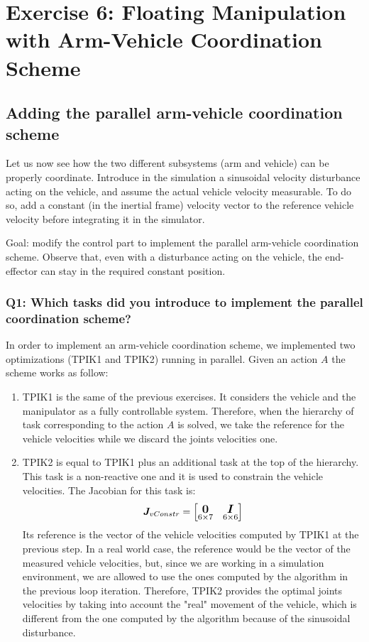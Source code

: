 \documentclass{article}
\begin{document}
\section{Exercise 6: Floating Manipulation with Arm-Vehicle Coordination Scheme}
\subsection{Adding the parallel arm-vehicle coordination scheme}
Let us now see how the two different subsystems (arm and vehicle) can be properly coordinate. Introduce in the simulation a sinusoidal velocity disturbance acting on the vehicle, and assume the actual vehicle velocity measurable. To do so, add a constant (in the inertial frame) velocity vector to the reference vehicle velocity before integrating it in the simulator. 

Goal: modify the control part to implement the parallel arm-vehicle coordination scheme. Observe that, even with a disturbance acting on the vehicle, the end-effector can stay in the required constant position.

\subsubsection{Q1: Which tasks did you introduce to implement the parallel coordination scheme?}
In order to implement an arm-vehicle coordination scheme, we implemented two optimizations (TPIK1 and TPIK2) running in parallel. Given an action $A$ the scheme works as follow:

\begin{enumerate}
\item TPIK1 is the same of the previous exercises. It considers the vehicle and the manipulator as a fully controllable system. Therefore, when the hierarchy of task corresponding to the action $A$ is solved, we take the reference for the vehicle velocities while we discard the joints velocities one.
\item TPIK2 is equal to TPIK1 plus an additional task at the top of the hierarchy. This task is a non-reactive one and it is used to constrain the vehicle velocities. The Jacobian for this task is:
\begin{equation}
\large
\boldsymbol{J}_{vConstr}=
    \begin{bmatrix}
     \underset{6\times7}{\boldsymbol{0}} & \underset{6\times6}{\boldsymbol{I}} \\
    \end{bmatrix}
\end{equation}
Its reference is the vector of the vehicle velocities computed by TPIK1 at the previous step. In a real world case, the reference would be the vector of the measured vehicle velocities, but, since we are working in a simulation environment, we are allowed to use the ones computed by the algorithm in the previous loop iteration.
Therefore, TPIK2 provides the optimal joints velocities by taking into account the "real" movement of the vehicle, which is different from the one computed by the algorithm because of the sinusoidal disturbance.
\end{enumerate}
\end{document}
